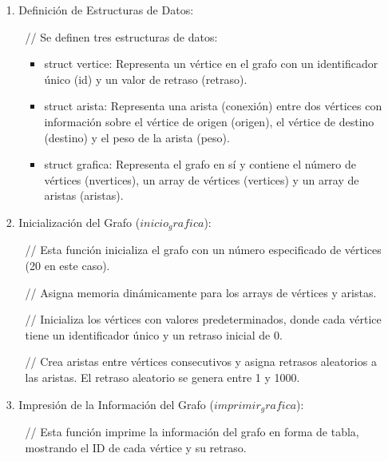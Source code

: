 \documentclass[a4paper,12pt]{article}
\begin{document}
\begin{itemize}
   \item[1.] Definición de Estructuras de Datos:
   \begin{itemize}
      \item[//] Se definen tres estructuras de datos:
      \begin{itemize}
         \item struct vertice: Representa un vértice en el grafo con un identificador único (id) y un valor de retraso (retraso).
         \item struct arista: Representa una arista (conexión) entre dos vértices con información sobre el vértice de origen (origen), el vértice de destino (destino) y el peso de la arista (peso).
         \item struct grafica: Representa el grafo en sí y contiene el número de vértices (nvertices), un array de vértices (vertices) y un array de aristas (aristas).
      \end{itemize}
   \end{itemize}

   \item[2.] Inicialización del Grafo ($inicio_grafica$):
   \begin{itemize}
      \item[//] Esta función inicializa el grafo con un número especificado de vértices (20 en este caso).
      \item[//] Asigna memoria dinámicamente para los arrays de vértices y aristas.
      \item[//] Inicializa los vértices con valores predeterminados, donde cada vértice tiene un identificador único y un retraso inicial de 0.
      \item[//] Crea aristas entre vértices consecutivos y asigna retrasos aleatorios a las aristas. El retraso aleatorio se genera entre 1 y 1000.
   \end{itemize}

   \item[3.] Impresión de la Información del Grafo ($imprimir_grafica$):
   \begin{itemize}
      \item[//] Esta función imprime la información del grafo en forma de tabla, mostrando el ID de cada vértice y su retraso.
   \end{itemize}


\end{itemize}
\end{document}
